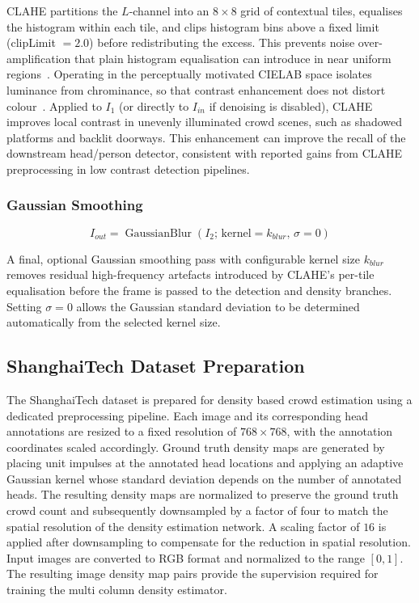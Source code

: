 CLAHE partitions the $L$-channel into an $8\times8$ grid of contextual tiles, equalises the histogram within each tile, and clips histogram bins above a fixed limit (clipLimit $=2.0$) before redistributing the excess. This prevents noise over-amplification that plain histogram equalisation can introduce in near uniform regions~\cite{zuiderveld1994clahe}. Operating in the perceptually motivated CIELAB space isolates luminance from chrominance, so that contrast enhancement does not distort colour~\cite{lab_colorspace}. Applied to $I_1$ (or directly to $I_{in}$ if denoising is disabled), CLAHE improves local contrast in unevenly illuminated crowd scenes, such as shadowed platforms and backlit doorways. This enhancement can improve the recall of the downstream head/person detector, consistent with reported gains from CLAHE preprocessing in low contrast detection pipelines.

\subsubsection{Gaussian Smoothing}

\begin{equation}
	I_{out} =
	\operatorname{GaussianBlur}\left(
	I_{2};\,\text{kernel}=k_{blur},\,\sigma=0
	\right)
	\label{eq:gaussian-blur}
\end{equation}

A final, optional Gaussian smoothing pass with configurable kernel size $k_{blur}$ removes residual high-frequency artefacts introduced by CLAHE's per-tile equalisation before the frame is passed to the detection and density branches. Setting $\sigma=0$ allows the Gaussian standard deviation to be determined automatically from the selected kernel size.

\subsection{ShanghaiTech Dataset Preparation}

The ShanghaiTech dataset is prepared for density based crowd estimation using a dedicated preprocessing pipeline. Each image and its corresponding head annotations are resized to a fixed resolution of $768\times768$, with the annotation coordinates scaled accordingly. Ground truth density maps are generated by placing unit impulses at the annotated head locations and applying an adaptive Gaussian kernel whose standard deviation depends on the number of annotated heads. The resulting density maps are normalized to preserve the ground truth crowd count and subsequently downsampled by a factor of four to match the spatial resolution of the density estimation network. A scaling factor of $16$ is applied after downsampling to compensate for the reduction in spatial resolution. Input images are converted to RGB format and normalized to the range $[0,1]$. The resulting image density map pairs provide the supervision required for training the multi column density estimator.

